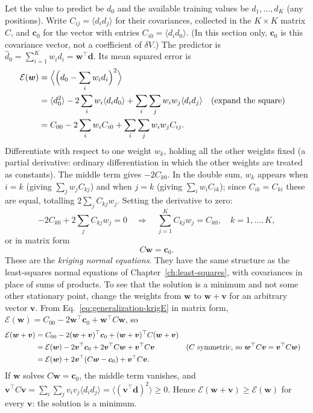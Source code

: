 Let the value to predict be $d_0$ and the available training values be $d_1,\dots,d_K$ (any positions). Write $C_{ij}=\langle d_id_j\rangle$ for their covariances, collected in the $K\times K$ matrix $C$, and $\bm c_0$ for the vector with entries $C_{i0}=\langle d_id_0\rangle$. (In this section only, $\bm c_0$ is this covariance vector, not a coefficient of $\delta V$.) The predictor is $\hat d_0=\sum_{i=1}^Kw_id_i=\bm w^\top\bm d$. Its mean squared error is
\begin{align}
\mathcal E(\bm w)&=\Bigl\langle\Bigl(d_0-\sum_iw_id_i\Bigr)^2\Bigr\rangle\notag\\
&=\langle d_0^2\rangle-2\sum_iw_i\langle d_id_0\rangle+\sum_i\sum_jw_iw_j\langle d_id_j\rangle&&\text{(expand the square)}\notag\\
&=C_{00}-2\sum_iw_iC_{i0}+\sum_i\sum_jw_iw_jC_{ij}.
\label{eq:generalization-krigE}
\end{align}
Differentiate with respect to one weight $w_k$, holding all the other weights fixed (a partial derivative: ordinary differentiation in which the other weights are treated as constants). The middle term gives $-2C_{k0}$. In the double sum, $w_k$ appears when $i=k$ (giving $\sum_jw_jC_{kj}$) and when $j=k$ (giving $\sum_iw_iC_{ik}$); since $C_{ik}=C_{ki}$ these are equal, totalling $2\sum_jC_{kj}w_j$. Setting the derivative to zero:
\begin{equation}
-2C_{k0}+2\sum_jC_{kj}w_j=0\quad\Longrightarrow\quad\sum_{j=1}^KC_{kj}w_j=C_{k0},\quad k=1,\dots,K,
\end{equation}
or in matrix form
\begin{equation}
C\bm w=\bm c_0.
\label{eq:generalization-krig}
\end{equation}
These are the \emph{kriging normal equations}. They have the same structure as the least-squares normal equations of Chapter~\ref{ch:least-squares}, with covariances in place of sums of products. To see that the solution is a minimum and not some other stationary point, change the weights from $\bm w$ to $\bm w+\bm v$ for an arbitrary vector $\bm v$. From Eq.~\eqref{eq:generalization-krigE} in matrix form, $\mathcal E(\bm w)=C_{00}-2\bm w^\top\bm c_0+\bm w^\top C\bm w$, so
\begin{align}
\mathcal E(\bm w+\bm v)&=C_{00}-2(\bm w+\bm v)^\top\bm c_0+(\bm w+\bm v)^\top C(\bm w+\bm v)\notag\\
&=\mathcal E(\bm w)-2\bm v^\top\bm c_0+2\bm v^\top C\bm w+\bm v^\top C\bm v&&\text{($C$ symmetric, so $\bm w^\top C\bm v=\bm v^\top C\bm w$)}\notag\\
&=\mathcal E(\bm w)+2\bm v^\top(C\bm w-\bm c_0)+\bm v^\top C\bm v.\notag
\end{align}
If $\bm w$ solves $C\bm w=\bm c_0$, the middle term vanishes, and $\bm v^\top C\bm v=\sum_i\sum_jv_iv_j\langle d_id_j\rangle=\langle(\bm v^\top\bm d)^2\rangle\ge0$. Hence $\mathcal E(\bm w+\bm v)\ge\mathcal E(\bm w)$ for every $\bm v$: the solution is a minimum.

